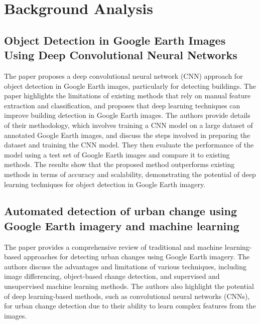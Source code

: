\newcommand{\package}[1]{\textbf{#1}} %
\newcommand{\cmmd}[1]{\textbackslash\texttt{#1}} %


\chapter{Background Analysis}

\section{Object Detection in Google Earth Images Using Deep Convolutional Neural Networks}
The paper\cite{one} proposes a deep convolutional neural network (CNN) approach for object detection in Google Earth images, particularly for detecting buildings. The paper highlights the limitations of existing methods that rely on manual feature extraction and classification, and proposes that deep learning techniques can improve building detection in Google Earth images. The authors provide details of their methodology, which involves training a CNN model on a large dataset of annotated Google Earth images, and discuss the steps involved in preparing the dataset and training the CNN model. They then evaluate the performance of the model using a test set of Google Earth images and compare it to existing methods. The results show that the proposed method outperforms existing methods in terms of accuracy and scalability, demonstrating the potential of deep learning techniques for object detection in Google Earth imagery.

\section{Automated detection of urban change using Google Earth imagery and machine learning}
The paper \cite{two} provides a comprehensive review of traditional and machine learning-based approaches for detecting urban changes using Google Earth imagery. The authors discuss the advantages and limitations of various techniques, including image differencing, object-based change detection, and supervised and unsupervised machine learning methods. The authors also highlight the potential of deep learning-based methods, such as convolutional neural networks (CNNs), for urban change detection due to their ability to learn complex features from the images.

